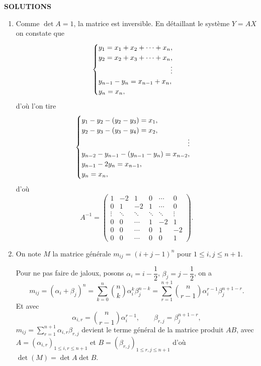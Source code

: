\begin{center}
{\Large\sffamily\bfseries\color{BellaLavenderDeep} SOLUTIONS}
\end{center}
\vspace{0.8em}

\begin{enumerate}[label=\arabic*.,leftmargin=2.2em,itemsep=1.2em]

\item Comme $\det A=1$, la matrice est inversible. En détaillant le système $Y=AX$ on constate que
\[
\begin{cases}
y_1=x_1+x_2+\cdots+x_n,\\
y_2=x_2+x_3+\cdots+x_n,\\
\hfill\vdots\\
y_{n-1}-y_n=x_{n-1}+x_n,\\
y_n=x_n,
\end{cases}
\]
d'où l'on tire
\[
\begin{cases}
y_1-y_2-(y_2-y_3)=x_1,\\
y_2-y_3-(y_3-y_4)=x_2,\\
\hfill\vdots\\
y_{n-2}-y_{n-1}-(y_{n-1}-y_n)=x_{n-2},\\
y_{n-1}-2y_n=x_{n-1},\\
y_n=x_n,
\end{cases}
\]
d'où
\[
A^{-1}=\begin{pmatrix}
1&-2&1&0&\cdots&0\\
0&1&-2&1&\cdots&0\\
\vdots&\ddots&\ddots&\ddots&\ddots&\vdots\\
0&0&\cdots&1&-2&1\\
0&0&\cdots&0&1&-2\\
0&0&\cdots&0&0&1
\end{pmatrix}.
\]

\item On note $M$ la matrice générale $m_{ij}=(i+j-1)^n$ pour $1\le i,j\le n+1$.

Pour ne pas faire de jaloux, posons $\alpha_i=i-\dfrac12$, $\beta_j=j-\dfrac12$, on a
\[
m_{ij}=(\alpha_i+\beta_j)^n=\sum_{k=0}^n\binom nk\alpha_i^k\beta_j^{n-k}
=\sum_{r=1}^{n+1}\binom n{r-1}\alpha_i^{r-1}\beta_j^{n+1-r}.
\]
Et avec
\[
\alpha_{i,r}=\binom n{r-1}\alpha_i^{r-1},\qquad
\beta_{r,j}=\beta_j^{n+1-r},
\]
$m_{ij}=\sum_{r=1}^{n+1}\alpha_{i,r}\beta_{r,j}$ devient le terme général de la matrice produit $AB$, avec $A=(\alpha_{i,r})_{1\le i,r\le n+1}$ et $B=(\beta_{r,j})_{1\le r,j\le n+1}$ d'où $\det(M)=\det A\det B$.


\end{enumerate}
